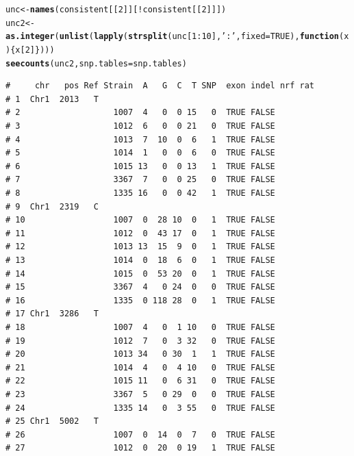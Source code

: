 \documentclass{article}\usepackage[]{graphicx}\usepackage[]{color}
\makeatletter
\newcommand{\hlnum}[1]{\textcolor[rgb]{0.686,0.059,0.569}{#1}}%
\newcommand{\hlstr}[1]{\textcolor[rgb]{0.192,0.494,0.8}{#1}}%
\newcommand{\hlopt}[1]{\textcolor[rgb]{0,0,0}{#1}}%
\newcommand{\hlstd}[1]{\textcolor[rgb]{0.345,0.345,0.345}{#1}}%
\newcommand{\hlkwa}[1]{\textcolor[rgb]{0.161,0.373,0.58}{\textbf{#1}}}%
\newcommand{\hlkwb}[1]{\textcolor[rgb]{0.69,0.353,0.396}{#1}}%
\newcommand{\hlkwc}[1]{\textcolor[rgb]{0.333,0.667,0.333}{#1}}%
\newcommand{\hlkwd}[1]{\textcolor[rgb]{0.737,0.353,0.396}{\textbf{#1}}}%
\newenvironment{kframe}{%
 \def\at@end@of@kframe{}%
 \ifinner\ifhmode%
  \def\at@end@of@kframe{\end{minipage}}%
  \begin{minipage}{\columnwidth}%
 \fi\fi%
 \def\FrameCommand##1{\hskip\@totalleftmargin \hskip-\fboxsep
 \colorbox{shadecolor}{##1}\hskip-\fboxsep
     \hskip-\linewidth \hskip-\@totalleftmargin \hskip\columnwidth}%
 \MakeFramed {\advance\hsize-\width
   \@totalleftmargin\z@ \linewidth\hsize
   \@setminipage}}%
 {\par\unskip\endMakeFramed%
 \at@end@of@kframe}
\newenvironment{knitrout}{}{} %
\makeatother
\begin{document}
\begin{knitrout}\footnotesize
{}\color{fgcolor}\begin{kframe}
\begin{alltt}
\hlstd{unc} \hlkwb{<-} \hlkwd{names}\hlstd{(consistent[[}\hlnum{2}\hlstd{]][}\hlopt{!}\hlstd{consistent[[}\hlnum{2}\hlstd{]]])}
\hlstd{unc2} \hlkwb{<-} \hlkwd{as.integer}\hlstd{(}\hlkwd{unlist}\hlstd{(}\hlkwd{lapply}\hlstd{(}\hlkwd{strsplit}\hlstd{(unc[}\hlnum{1}\hlopt{:}\hlnum{10}\hlstd{],}\hlstr{':'}\hlstd{,}\hlkwc{fixed}\hlstd{=}\hlnum{TRUE}\hlstd{),}\hlkwa{function}\hlstd{(}\hlkwc{x}\hlstd{)\{x[}\hlnum{2}\hlstd{]\})))}
\hlkwd{seecounts}\hlstd{(unc2,}\hlkwc{snp.tables}\hlstd{=snp.tables)}
\end{alltt}
\begin{verbatim}
#     chr   pos Ref Strain  A   G  C  T SNP  exon indel nrf rat
# 1  Chr1  2013   T                                            
# 2                   1007  4   0  0 15   0  TRUE FALSE        
# 3                   1012  6   0  0 21   0  TRUE FALSE        
# 4                   1013  7  10  0  6   1  TRUE FALSE        
# 5                   1014  1   0  0  6   0  TRUE FALSE        
# 6                   1015 13   0  0 13   1  TRUE FALSE        
# 7                   3367  7   0  0 25   0  TRUE FALSE        
# 8                   1335 16   0  0 42   1  TRUE FALSE        
# 9  Chr1  2319   C                                            
# 10                  1007  0  28 10  0   1  TRUE FALSE        
# 11                  1012  0  43 17  0   1  TRUE FALSE        
# 12                  1013 13  15  9  0   1  TRUE FALSE        
# 13                  1014  0  18  6  0   1  TRUE FALSE        
# 14                  1015  0  53 20  0   1  TRUE FALSE        
# 15                  3367  4   0 24  0   0  TRUE FALSE        
# 16                  1335  0 118 28  0   1  TRUE FALSE        
# 17 Chr1  3286   T                                            
# 18                  1007  4   0  1 10   0  TRUE FALSE        
# 19                  1012  7   0  3 32   0  TRUE FALSE        
# 20                  1013 34   0 30  1   1  TRUE FALSE        
# 21                  1014  4   0  4 10   0  TRUE FALSE        
# 22                  1015 11   0  6 31   0  TRUE FALSE        
# 23                  3367  5   0 29  0   0  TRUE FALSE        
# 24                  1335 14   0  3 55   0  TRUE FALSE        
# 25 Chr1  5002   T                                            
# 26                  1007  0  14  0  7   0  TRUE FALSE        
# 27                  1012  0  20  0 19   1  TRUE FALSE        

\end{verbatim}
\end{kframe}
\end{knitrout}
\end{document}
